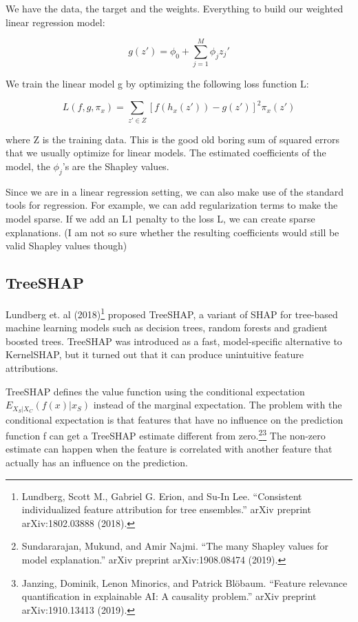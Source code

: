 \documentclass[
  12pt,
]{krantz}
\begin{document}
We have the data, the target and the weights.
Everything to build our weighted linear regression model:

\[g(z')=\phi_0+\sum_{j=1}^M\phi_jz_j'\]

We train the linear model g by optimizing the following loss function L:

\[L(f,g,\pi_{x})=\sum_{z'\in{}Z}[f(h_x(z'))-g(z')]^2\pi_{x}(z')\]

where Z is the training data.
This is the good old boring sum of squared errors that we usually optimize for linear models.
The estimated coefficients of the model, the \(\phi_j\)'s are the Shapley values.

Since we are in a linear regression setting, we can also make use of the standard tools for regression.
For example, we can add regularization terms to make the model sparse.
If we add an L1 penalty to the loss L, we can create sparse explanations.
(I am not so sure whether the resulting coefficients would still be valid Shapley values though)

\hypertarget{treeshap}{%
\subsection{TreeSHAP}\label{treeshap}}

Lundberg et. al (2018)\footnote{Lundberg, Scott M., Gabriel G. Erion, and Su-In Lee. ``Consistent individualized feature attribution for tree ensembles.'' arXiv preprint arXiv:1802.03888 (2018).} proposed TreeSHAP, a variant of SHAP for tree-based machine learning models such as decision trees, random forests and gradient boosted trees.
TreeSHAP was introduced as a fast, model-specific alternative to KernelSHAP, but it turned out that it can produce unintuitive feature attributions.

TreeSHAP defines the value function using the conditional expectation \(E_{X_S|X_C}(f(x)|x_S)\) instead of the marginal expectation.
The problem with the conditional expectation is that features that have no influence on the prediction function f can get a TreeSHAP estimate different from zero.\footnote{Sundararajan, Mukund, and Amir Najmi. ``The many Shapley values for model explanation.'' arXiv preprint arXiv:1908.08474 (2019).}\footnote{Janzing, Dominik, Lenon Minorics, and Patrick Blöbaum. ``Feature relevance quantification in explainable AI: A causality problem.'' arXiv preprint arXiv:1910.13413 (2019).}
The non-zero estimate can happen when the feature is correlated with another feature that actually has an influence on the prediction.
\end{document}
